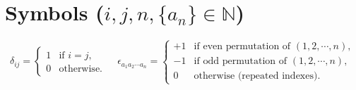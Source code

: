 \section*{Symbols \normalfont\scriptsize{($i,j,n,\{a_n\}\in\mathbb{N}$)}}
\[
\delta_{ij}\!=\!\begin{cases}1&\!\!\!\text{if }i\!=\!j,\\0&\!\!\!\text{otherwise.}\end{cases}
\;\;\; \; 
\epsilon_{a_1 a_2\cdots a_n}\!=\!\begin{cases}
+1&\!\!\!\text{if even permutation of }(1,2,\cdots, n),\\
-1&\!\!\!\text{if odd \ permutation of }(1,2, \cdots,n),\\
0&\!\!\!\text{otherwise (repeated indexes).}
\end{cases}
\]